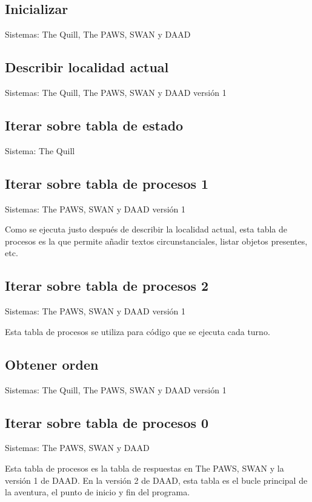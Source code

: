 \documentclass[11pt, a5paper]{article}
\newcommand{\quill}{\textsf{The Quill}\xspace}
\newcommand{\paw}{\textsf{The PAWS}\xspace}
\newcommand{\swan}{\textsf{SWAN}\xspace}
\newcommand{\daad}{\textsf{DAAD}\xspace}
\newcommand{\sistema}[1]{\noindent Sistema: #1 \nopagebreak}
\newcommand{\sistemas}[1]{\noindent Sistemas: #1 \nopagebreak}
\begin{document}
\subsection{Inicializar}

\sistemas{\quill, \paw, \swan y \daad}

\subsection{Describir localidad actual}

\sistemas{\quill, \paw, \swan y \daad versión 1}

\subsection{Iterar sobre tabla de estado}

\sistema{\quill}

\subsection{Iterar sobre tabla de procesos 1}

\sistemas{\paw, \swan y \daad versión 1}

Como se ejecuta justo después de describir la localidad actual, esta tabla de procesos es la que permite añadir textos circunstanciales, listar objetos presentes, etc.

\subsection{Iterar sobre tabla de procesos 2}

\sistemas{\paw, \swan y \daad versión 1}

Esta tabla de procesos se utiliza para código que se ejecuta cada turno.

\subsection{Obtener orden}

\sistemas{\quill, \paw, \swan y \daad versión 1}

\subsection{Iterar sobre tabla de procesos 0}

\sistemas{\paw, \swan y \daad}

Esta tabla de procesos es la tabla de respuestas en \paw, \swan y la versión 1 de \daad. En la versión 2 de \daad, esta tabla es el bucle principal de la aventura, el punto de inicio y fin del programa.
\end{document}
